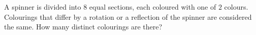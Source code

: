 A spinner is divided into $8$ equal sections, each coloured with one of $2$ colours. Colourings that differ by a rotation or a reflection of the spinner are considered the same. How many distinct colourings are there?
